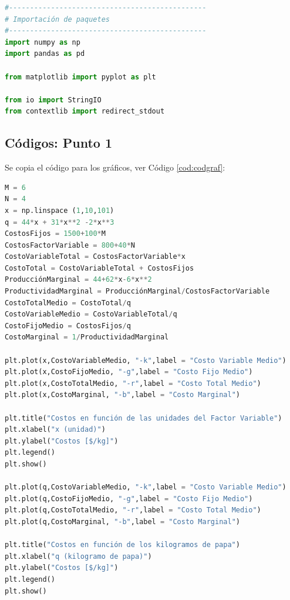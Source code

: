 \begin{lstlisting}[language=Python,frame=single,caption=Importación de paquetes,label={cod:paquete}]
#-----------------------------------------------
# Importación de paquetes
#-----------------------------------------------
import numpy as np
import pandas as pd

from matplotlib import pyplot as plt

from io import StringIO
from contextlib import redirect_stdout

\end{lstlisting}

\subsection{Códigos: Punto 1}

Se copia el código para los gráficos, ver Código \ref{cod:codgraf}:

\begin{lstlisting}[language=Python,frame=single,caption=Códigos de gráficos,label={cod:codgraf}]
M = 6
N = 4
x = np.linspace (1,10,101)
q = 44*x + 31*x**2 -2*x**3
CostosFijos = 1500+100*M
CostosFactorVariable = 800+40*N
CostoVariableTotal = CostosFactorVariable*x
CostoTotal = CostoVariableTotal + CostosFijos
ProducciónMarginal = 44+62*x-6*x**2
ProductividadMarginal = ProducciónMarginal/CostosFactorVariable
CostoTotalMedio = CostoTotal/q
CostoVariableMedio = CostoVariableTotal/q
CostoFijoMedio = CostosFijos/q
CostoMarginal = 1/ProductividadMarginal

plt.plot(x,CostoVariableMedio, "-k",label = "Costo Variable Medio")
plt.plot(x,CostoFijoMedio, "-g",label = "Costo Fijo Medio")
plt.plot(x,CostoTotalMedio, "-r",label = "Costo Total Medio")
plt.plot(x,CostoMarginal, "-b",label = "Costo Marginal")

plt.title("Costos en función de las unidades del Factor Variable")
plt.xlabel("x (unidad)")
plt.ylabel("Costos [$/kg]")
plt.legend()
plt.show()

plt.plot(q,CostoVariableMedio, "-k",label = "Costo Variable Medio")
plt.plot(q,CostoFijoMedio, "-g",label = "Costo Fijo Medio")
plt.plot(q,CostoTotalMedio, "-r",label = "Costo Total Medio")
plt.plot(q,CostoMarginal, "-b",label = "Costo Marginal")

plt.title("Costos en función de los kilogramos de papa")
plt.xlabel("q (kilogramo de papa)")
plt.ylabel("Costos [$/kg]")
plt.legend()
plt.show()
\end{lstlisting}








